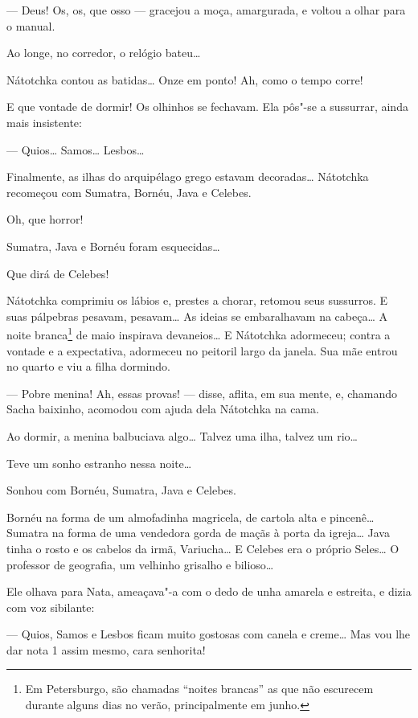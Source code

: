 --- Deus! Os, os, que osso --- gracejou a moça,
amargurada, e voltou a olhar para o manual.

Ao longe, no corredor, o relógio bateu\ldots{}

Nátotchka contou as batidas\ldots{} Onze em ponto! Ah, como o tempo corre!

E que vontade de dormir! Os olhinhos se fechavam. Ela pôs"-se a
sussurrar, ainda mais insistente:

--- Quios\ldots{} Samos\ldots{} Lesbos\ldots{}

Finalmente, as ilhas do arquipélago grego estavam decoradas\ldots{} Nátotchka
recomeçou com Sumatra, Bornéu, Java e Celebes.

Oh, que horror!

Sumatra, Java e Bornéu foram esquecidas\ldots{}

Que dirá de Celebes!

Nátotchka comprimiu os lábios e, prestes a chorar, retomou seus
sussurros. E suas pálpebras pesavam, pesavam\ldots{} As ideias se
embaralhavam na cabeça\ldots{} A noite branca\footnote{Em Petersburgo, são
  chamadas ``noites brancas'' as que não escurecem durante alguns dias no verão, principalmente em junho.} de maio inspirava devaneios\ldots{} E
Nátotchka adormeceu; contra a vontade e a expectativa, adormeceu no
peitoril largo da janela. Sua mãe entrou no quarto e viu a filha
dormindo.

--- Pobre menina! Ah, essas provas! --- disse, aflita, em sua mente, e,
chamando Sacha baixinho, acomodou com ajuda dela Nátotchka na cama.

Ao dormir, a menina balbuciava algo\ldots{} Talvez uma ilha, talvez um rio\ldots{}

Teve um sonho estranho nessa noite\ldots{}

Sonhou com Bornéu, Sumatra, Java e Celebes.

Bornéu na forma de um almofadinha magricela, de cartola alta e
pincenê\ldots{} Sumatra na forma de uma vendedora gorda de maçãs à porta da
igreja\ldots{} Java tinha o rosto e os cabelos da irmã, Variucha\ldots{} E Celebes
era o próprio Seles\ldots{} O professor de geografia, um velhinho grisalho e
bilioso\ldots{}

Ele olhava para Nata, ameaçava"-a com o dedo de unha amarela e estreita,
e dizia com voz sibilante:

--- Quios, Samos e Lesbos ficam muito gostosas com canela e creme\ldots{} Mas
vou lhe dar nota 1 assim mesmo, cara senhorita!

